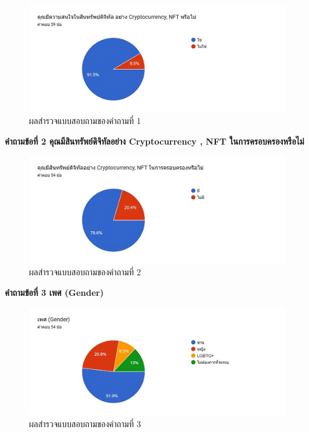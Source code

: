 \documentclass[12pt,oneside,openright,a4paper]{cpe-thai-project}
\begin{document}
\begin{figure}[!thb]
			\centering
			\includegraphics[scale=0.3]{apprex1}
			\caption{ผลสำรวจแบบสอบถามของคำถามที่ 1}
		\end{figure}
\FloatBarrier
\bf คำถามข้อที่ 2 คุณมีสินทรัพย์ดิจิทัลอย่าง Cryptocurrency , NFT ในการครอบครองหรือไม่\\
\begin{figure}[!thb]
			\centering
			\includegraphics[scale=0.3]{apprex2}
			\caption{ผลสำรวจแบบสอบถามของคำถามที่ 2}
		\end{figure}
\FloatBarrier

\clearpage
\bf คำถามข้อที่ 3 เพศ (Gender)\\
\begin{figure}[!thb]
			\centering
			\includegraphics[scale=0.3]{apprex3}
			\caption{ผลสำรวจแบบสอบถามของคำถามที่ 3}
		\end{figure}
\FloatBarrier
\end{document}
